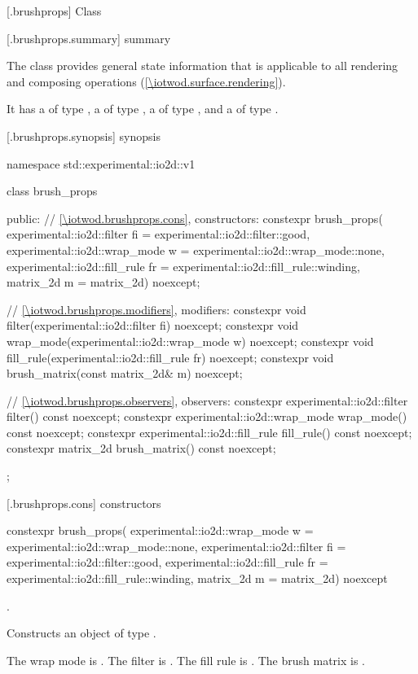 
 [\iotwod.brushprops] {Class }

 [\iotwod.brushprops.summary] { summary}

\pnum
{}%
The  class provides general state information that is applicable to all rendering and composing operations (\ref{\iotwod.surface.rendering}).

\pnum
It has a  of type , a  of type , a  of type , and a  of type .

 [\iotwod.brushprops.synopsis] { synopsis}

\begin{codeblock}
namespace std::experimental::io2d::v1 {
  class brush_props {
  public:
    // \ref{\iotwod.brushprops.cons}, constructors:
    constexpr brush_props(
      experimental::io2d::filter fi = experimental::io2d::filter::good,
      experimental::io2d::wrap_mode w = experimental::io2d::wrap_mode::none,
      experimental::io2d::fill_rule fr = experimental::io2d::fill_rule::winding,
      matrix_2d m = matrix_2d{}) noexcept;

    // \ref{\iotwod.brushprops.modifiers}, modifiers:
    constexpr void filter(experimental::io2d::filter fi) noexcept;
    constexpr void wrap_mode(experimental::io2d::wrap_mode w) noexcept;
    constexpr void fill_rule(experimental::io2d::fill_rule fr) noexcept;
    constexpr void brush_matrix(const matrix_2d& m) noexcept;

    // \ref{\iotwod.brushprops.observers}, observers:
    constexpr experimental::io2d::filter filter() const noexcept;
    constexpr experimental::io2d::wrap_mode wrap_mode() const noexcept;
    constexpr experimental::io2d::fill_rule fill_rule() const noexcept;
    constexpr matrix_2d brush_matrix() const noexcept;
  };
}
\end{codeblock}

 [\iotwod.brushprops.cons] { constructors}

%
\begin{itemdecl}
constexpr brush_props(
  experimental::io2d::wrap_mode w = experimental::io2d::wrap_mode::none,
  experimental::io2d::filter fi = experimental::io2d::filter::good,
  experimental::io2d::fill_rule fr = experimental::io2d::fill_rule::winding,
  matrix_2d m = matrix_2d{}) noexcept    
\end{itemdecl}
\begin{itemdescr}
\onecolumn
\requires
{}.

\pnum
\effects
Constructs an object of type .

\pnum
The wrap mode is . The filter is . The fill rule is . The brush matrix is .
\end{itemdescr}

